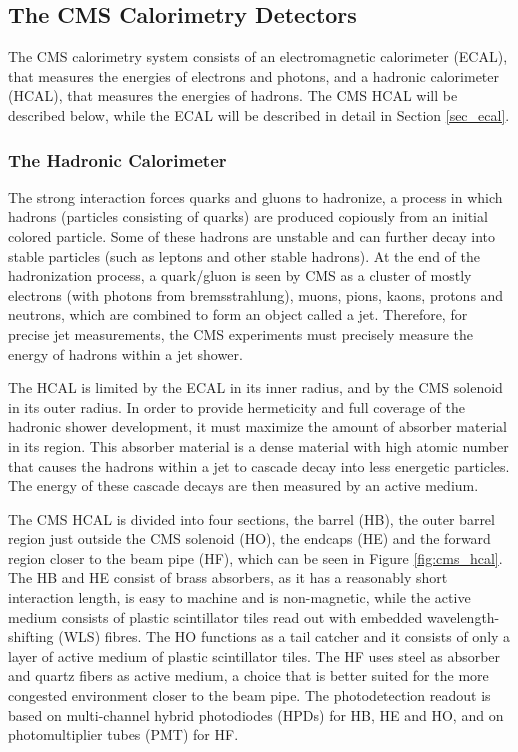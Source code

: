\subsection{The CMS Calorimetry Detectors}

The CMS calorimetry system consists of an electromagnetic calorimeter (ECAL), that measures the energies of electrons and photons, and a hadronic calorimeter (HCAL), that measures the energies of hadrons. 
The CMS HCAL will be described below, while the ECAL will be described in detail in Section \ref{sec_ecal}.

\subsubsection{The Hadronic Calorimeter}

The strong interaction forces quarks and gluons to hadronize, a process in which hadrons (particles consisting of quarks) are produced copiously from an initial colored particle. 
Some of these hadrons are unstable and can further decay into stable particles (such as leptons and other stable hadrons). 
At the end of the hadronization process, a quark/gluon is seen by CMS as a cluster of mostly electrons (with photons from bremsstrahlung), muons, pions, kaons, protons and neutrons, which are combined to form an object called a jet. 
Therefore, for precise jet measurements, the CMS experiments must precisely measure the energy of hadrons within a jet shower. 

The HCAL is limited by the ECAL in its inner radius, and by the CMS solenoid in its outer radius. 
In order to provide hermeticity and full coverage of the hadronic shower development, it must maximize the amount of absorber material in its region. 
This absorber material is a dense material with high atomic number that causes the hadrons within a jet to cascade decay into less energetic particles.
The energy of these cascade decays are then measured by an active medium. 

The CMS HCAL is divided into four sections, the barrel (HB), the outer barrel region just outside the CMS solenoid (HO), the endcaps (HE) and the forward region closer to the beam pipe (HF), which can be seen in Figure \ref{fig:cms_hcal}. 
The HB and HE consist of brass absorbers, as it has a reasonably short interaction length, is easy to machine and is non-magnetic, while the active medium consists of plastic scintillator tiles read out with embedded wavelength-shifting (WLS) fibres. 
The HO functions as a tail catcher and it consists of only a layer of active medium of plastic scintillator tiles. 
The HF uses steel as absorber  and quartz fibers as active medium, a choice that is better suited for the more congested environment closer to the beam pipe. 
The photodetection readout is based on multi-channel hybrid photodiodes (HPDs) for HB, HE and HO, and on photomultiplier tubes (PMT) for HF.

